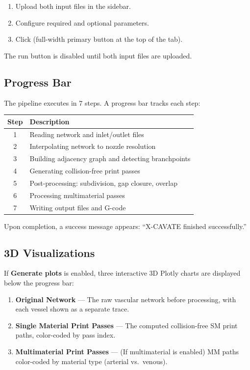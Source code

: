 \documentclass[11pt,letterpaper]{article}
\newcommand{\gui}[1]{\textcolor{guicolor}{\textsf{\textbf{#1}}}}
\newcommand{\btn}[1]{\fbox{\textsf{#1}}}
\begin{document}
\begin{enumerate}[leftmargin=*]
    \item Upload both input files in the sidebar.
    \item Configure required and optional parameters.
    \item Click \btn{Run X-CAVATE} (full-width primary button at the top of the tab).
\end{enumerate}

\begin{infobox}
The run button is disabled until both input files are uploaded.
\end{infobox}

\subsection{Progress Bar}

The pipeline executes in 7 steps. A progress bar tracks each step:

\begin{tabularx}{\textwidth}{c X}
\toprule
\textbf{Step} & \textbf{Description} \\
\midrule
1 & Reading network and inlet/outlet files \\
2 & Interpolating network to nozzle resolution \\
3 & Building adjacency graph and detecting branchpoints \\
4 & Generating collision-free print passes \\
5 & Post-processing: subdivision, gap closure, overlap \\
6 & Processing multimaterial passes \\
7 & Writing output files and G-code \\
\bottomrule
\end{tabularx}

Upon completion, a success message appears: ``X-CAVATE finished successfully.''

\subsection{3D Visualizations}

If \gui{Generate plots} is enabled, three interactive 3D Plotly charts are
displayed below the progress bar:

\begin{enumerate}[leftmargin=*]
    \item \textbf{Original Network} --- The raw vascular network before processing, with each vessel shown as a separate trace.
    \item \textbf{Single Material Print Passes} --- The computed collision-free SM print paths, color-coded by pass index.
    \item \textbf{Multimaterial Print Passes} --- (If multimaterial is enabled) MM paths color-coded by material type (arterial vs.\ venous).
\end{enumerate}
\end{document}
